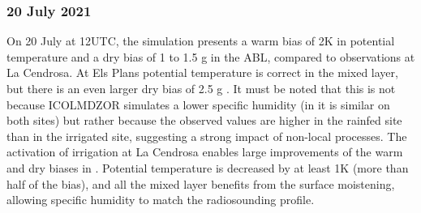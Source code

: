 \subsubsection*{20 July 2021}

On 20 July at 12UTC, the \noirr simulation presents a warm bias of 2K in potential temperature and a dry bias of 1 to 1.5 g \perkg in the ABL, compared to observations at La Cendrosa. 
At Els Plans potential temperature is correct in the mixed layer, but there is an even larger dry bias of 2.5 g \perkg. It must be noted that this is not because ICOLMDZOR simulates a lower specific humidity (in \noirr it is similar on both sites) but rather because the observed values are higher in the rainfed site than in the irrigated site, suggesting a strong impact of non-local processes.
The activation of irrigation at La Cendrosa enables large improvements of the warm and dry biases in \irrboost. Potential temperature is decreased by at least 1K (more than half of the bias), and all the mixed layer benefits from the surface moistening, allowing specific humidity to match the radiosounding profile. 


